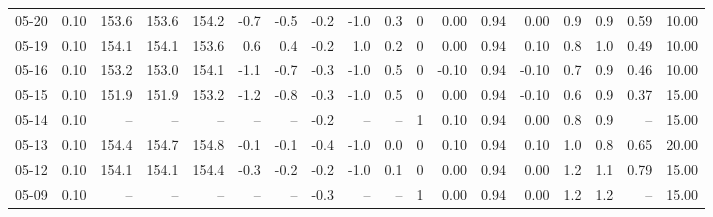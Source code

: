 \begin{threeparttable}
{\begin{tabular}{lrrrrrrrrrrrrrrrrr}
  05-20 &     0.10 & 153.6 & 153.6 & 154.2 &       -0.7 &           -0.5 &                      -0.2 &                     -1.0 &                 0.3 &              0 &       0.00 &      0.94 &           0.00 &              0.9 &                 0.9 &            0.59 &                  10.00 \\
  05-19 &     0.10 & 154.1 & 154.1 & 153.6 &        0.6 &            0.4 &                      -0.2 &                      1.0 &                 0.2 &              0 &       0.00 &      0.94 &           0.10 &              0.8 &                 1.0 &            0.49 &                  10.00 \\
  05-16 &     0.10 & 153.2 & 153.0 & 154.1 &       -1.1 &           -0.7 &                      -0.3 &                     -1.0 &                 0.5 &              0 &      -0.10 &      0.94 &          -0.10 &              0.7 &                 0.9 &            0.46 &                  10.00 \\
  05-15 &     0.10 & 151.9 & 151.9 & 153.2 &       -1.2 &           -0.8 &                      -0.3 &                     -1.0 &                 0.5 &              0 &       0.00 &      0.94 &          -0.10 &              0.6 &                 0.9 &            0.37 &                  15.00 \\
  05-14 &     0.10 &    -- &    -- &    -- &         -- &             -- &                      -0.2 &                       -- &                  -- &              1 &       0.10 &      0.94 &           0.00 &              0.8 &                 0.9 &              -- &                  15.00 \\
  05-13 &     0.10 & 154.4 & 154.7 & 154.8 &       -0.1 &           -0.1 &                      -0.4 &                     -1.0 &                 0.0 &              0 &       0.10 &      0.94 &           0.10 &              1.0 &                 0.8 &            0.65 &                  20.00 \\
  05-12 &     0.10 & 154.1 & 154.1 & 154.4 &       -0.3 &           -0.2 &                      -0.2 &                     -1.0 &                 0.1 &              0 &       0.00 &      0.94 &           0.00 &              1.2 &                 1.1 &            0.79 &                  15.00 \\
  05-09 &     0.10 &    -- &    -- &    -- &         -- &             -- &                      -0.3 &                       -- &                  -- &              1 &       0.00 &      0.94 &           0.00 &              1.2 &                 1.2 &              -- &                  15.00 \\

\end{tabular}}
\end{threeparttable}
